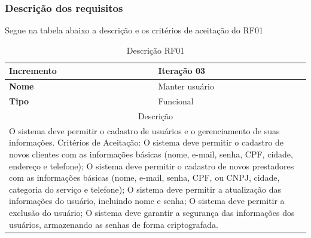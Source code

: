 \begin{table}[htb]
\begin{tabular}{|l|p{8cm}|p{3cm}|}
	\end{tabular}
\end{table}
\clearpage
\subsubsection{Descrição dos requisitos}
Segue na tabela abaixo a descrição e os critérios de aceitação do RF01
\begin{table}[htb]
	\centering
	\caption{\label{Formatação do texto.}Descrição RF01}	
	\begin{tabular}{|l|p{11cm}|}
		\hline
		\textbf{Incremento}    & Iteração 03\\ \hline
		\textbf{Nome}    & Manter usuário\\ \hline
		\textbf{Tipo}    & Funcional\\ \hline
		\multicolumn{2}{|c|}{Descrição}\\ \hline
		\multicolumn{2}{|p{12cm}|}{
			O sistema deve permitir o cadastro de usuários e o gerenciamento de suas informações. \newline
			\newline Critérios de Aceitação: \newline
			O sistema deve permitir o cadastro de novos clientes com as informações básicas (nome, e-mail, senha, CPF, cidade, endereço e telefone); \newline
			\newline O sistema deve permitir o cadastro de novos prestadores com as informações básicas (nome, e-mail, senha, CPF, ou CNPJ, cidade, categoria do serviço e telefone); \newline
			\newline O sistema deve permitir a atualização das informações do usuário, incluindo nome e senha; \newline
			\newline O sistema deve permitir a exclusão do usuário; \newline
			O sistema deve garantir a segurança das informações dos usuários, armazenando as senhas de forma criptografada.
			} \\ \hline
	\end{tabular}
\end{table}
\clearpage
